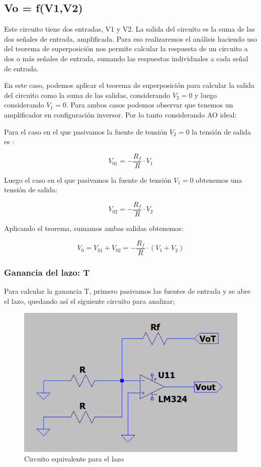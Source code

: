 \subsection{Vo = f(V1,V2)}

Este circuito tiene dos entradas, V1 y V2. 
La salida del circuito es la suma de las dos señales de entrada, amplificada. Para eso realizaremos el análisis haciendo uso del teorema de superposición nos permite calcular la respuesta de un circuito a dos o más señales de entrada, sumando las respuestas individuales a cada señal de entrada.

En este caso, podemos aplicar el teorema de superposición para calcular la salida del circuito como la suma de las salidas, considerando $V_2=0$ y luego considerando $V_1=0$. Para ambos casos podemos observar que tenemos un amplificador en configuración inversor. Por lo tanto considerando AO ideal: 

\vspace{1em}

Para el caso en el que pasivamos la fuente de tensión $V_2 = 0$ la tensión de salida es :

\[V_{01} = - \frac{R_f}{R} \cdot V_1 \]

Luego el caso en el que pasivamos la fuente de tensión $V_1 = 0$ obtenemos una tensión de salida:

\[V_{02} = - \frac{R_f}{R} \cdot V_2 \]

Aplicando el teorema, sumamos ambas salidas obtenemos:

\[V_{0} = V_{01} + V_{02} = - \frac{R_f}{R} \cdot (V_1 + V_2) \]

\vspace{1em}

\subsubsection{Ganancia del lazo: T}
Para calcular la ganancia T, primero pasivamos las fuentes de entrada y se abre el lazo, quedando así el siguiente circuito para analizar;

\begin{figure}[h!]
    \centering
    \includegraphics[width=0.90\linewidth]{img/equivalente_lazo.png}
    \caption{Circuito equivalente para el lazo}
    \label{fig:equivalente_lazo}
\end{figure}



